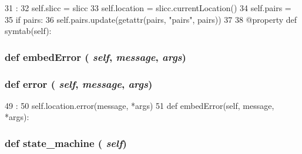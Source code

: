 \begin{DoxyCode}
31                                          :
32         self.slicc = slicc
33         self.location = slicc.currentLocation()
34         self.pairs = {}
35         if pairs:
36             self.pairs.update(getattr(pairs, "pairs", pairs))
37 
38     @property
    def symtab(self):
\end{DoxyCode}
\hypertarget{classslicc_1_1ast_1_1AST_1_1AST_ad3142f583b5f49478c9e2f319e9f7267}{
\subsubsection[{embedError}]{\setlength{\rightskip}{0pt plus 5cm}def embedError ( {\em self}, \/   {\em message}, \/   {\em args})}}
\label{classslicc_1_1ast_1_1AST_1_1AST_ad3142f583b5f49478c9e2f319e9f7267}



\hypertarget{classslicc_1_1ast_1_1AST_1_1AST_a3133d4a0dde10b6ebe257e3db716a3e0}{
\subsubsection[{error}]{\setlength{\rightskip}{0pt plus 5cm}def error ( {\em self}, \/   {\em message}, \/   {\em args})}}
\label{classslicc_1_1ast_1_1AST_1_1AST_a3133d4a0dde10b6ebe257e3db716a3e0}



\begin{DoxyCode}
49                                    :
50         self.location.error(message, *args)
51 
    def embedError(self, message, *args):
\end{DoxyCode}
\hypertarget{classslicc_1_1ast_1_1AST_1_1AST_ac4db0fc2cd33768643738f7f9d8bec5e}{
\subsubsection[{state\_\-machine}]{\setlength{\rightskip}{0pt plus 5cm}def state\_\-machine ( {\em self})}}
\label{classslicc_1_1ast_1_1AST_1_1AST_ac4db0fc2cd33768643738f7f9d8bec5e}



